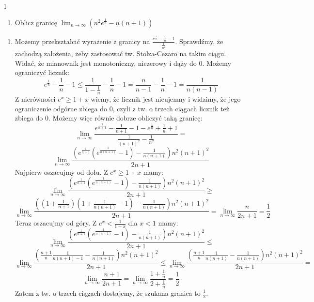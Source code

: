 \documentclass{../note}
\begin{document}
\begin{zadanie}{1}
\begin{enumerate}
    \item [(d)] Oblicz granicę $ \lim_{n\rightarrow\infty}(n^{2}e^{\frac{1}{n}}-n(n+1)) $
\end{enumerate}
\end{zadanie}
\begin{rozwiazanie}
\begin{enumerate}
    \item [(d)] Możemy przekształcić wyrażenie z granicy na $\frac{e^{\frac1n} - \frac1n - 1}{\frac{1}{n^2}}$. Sprawdźmy, że zachodzą założenia, żeby zastosować tw. Stolza-Cezaro na takim ciągu. Widać, że mianownik jest monotoniczny, niezerowy i dąży do $0$. Możemy ograniczyć licznik:
    \[e^{\frac1n} - \frac1n - 1 \leq \frac{1}{1 - \frac1n} - \frac1n - 1 = \frac{n}{n-1} - \frac1n - 1 = \frac{1}{n(n-1)}\]
    Z nierówności $e^x \geq 1 + x$ wiemy, że licznik jest nieujemny i widzimy, że jego ograniczenie odgórne zbiega do 0, czyli z tw. o trzech ciągach licznik też zbiega do 0. Możemy więc równie dobrze obliczyć taką granicę:
    \[\lim_{n\to\infty} \frac{e^{\frac1{n+1}} - \frac1{n+1} - 1 - e^{\frac1n} + \frac1n + 1}{\frac{1}{(n+1)^2} - \frac{1}{n^2}} =\]
    \[\lim_{n\to\infty} \frac{\left(e^{\frac{1}{n+1}}\left(e^{\frac{1}{n(n+1)}} - 1\right) - \frac{1}{n(n+1)}\right)n^2(n+1)^2}{2n + 1}\]
    Najpierw oszacujmy od dołu. Z $e^x \geq 1 + x$ mamy:
    \[\lim_{n\to\infty} \frac{\left(e^{\frac{1}{n+1}}\left(e^{\frac{1}{n(n+1)}} - 1\right) - \frac{1}{n(n+1)}\right)n^2(n+1)^2}{2n + 1} \geq\] 
    \[\lim_{n\to\infty} \frac{\left(\left(1 + \frac{1}{n+1}\right)\left(1 + \frac{1}{n(n+1)} - 1\right) - \frac{1}{n(n+1)}\right)n^2(n+1)^2}{2n + 1} = \lim_{n\to\infty}  \frac{n}{2n + 1} = \frac12\]
    Teraz oszacujmy od góry. Z $e^x < \frac{1}{1-x}$ dla $x < 1$ mamy:
    \[\lim_{n\to\infty} \frac{\left(e^{\frac{1}{n+1}}\left(e^{\frac{1}{n(n+1)}} - 1\right) - \frac{1}{n(n+1)}\right)n^2(n+1)^2}{2n + 1} \leq\]
    \[\lim_{n\to\infty} \frac{\left(\frac{n + 1}{n} \frac{1}{n(n+1) - 1} - \frac{1}{n(n+1)}\right)n^2(n+1)^2}{2n + 1} \leq \lim_{n\to\infty} \frac{\left(\frac{n + 1}{n} \frac{1}{n(n+1)} - \frac{1}{n(n+1)}\right)n^2(n+1)^2}{2n + 1} =\]
    \[\lim_{n\to\infty} \frac{n+1}{2n+1} = \lim_{n\to\infty} \frac{1 + \frac1n}{2 + \frac1n} = \frac12\]
    Zatem z tw. o trzech ciągach dostajemy, że szukana granica to $\frac12$.
\end{enumerate}
\end{rozwiazanie}
\end{document}
